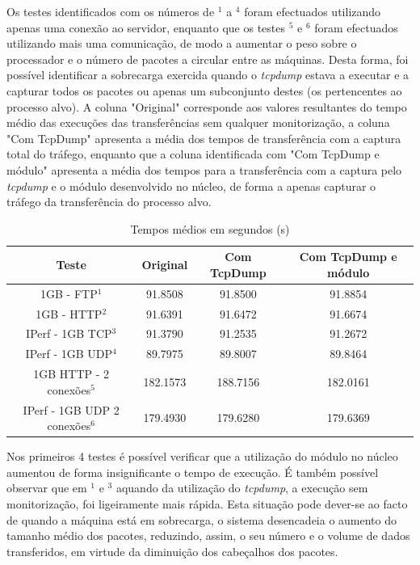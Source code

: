 \documentclass[a4paper]{llncs}
\begin{document}
Os testes identificados com os números de $^{1}$ a $^{4}$ foram efectuados utilizando apenas uma conexão ao servidor, enquanto que os testes $^{5}$ e $^{6}$ foram efectuados utilizando mais uma comunicação, de modo a aumentar o peso sobre o processador e o número de pacotes a circular entre as máquinas. 
 Desta forma, foi possível identificar a sobrecarga exercida quando o \textit{tcpdump} estava a executar e a capturar todos os pacotes ou apenas um subconjunto destes (os pertencentes ao processo alvo).
 A coluna "Original" corresponde aos valores resultantes do tempo médio das execuções das transferências sem qualquer monitorização, a coluna "Com TcpDump" apresenta a média dos tempos de transferência com a captura total do tráfego, enquanto que a coluna identificada com "Com TcpDump e módulo" apresenta a média dos tempos para a transferência com a captura pelo \textit{tcpdump} e o módulo desenvolvido no núcleo, de forma a apenas capturar o tráfego da transferência do processo alvo.
\vspace{-0.8cm}
\begin{table}
\begin{center}
\caption{Tempos médios em segundos (s)}
\begin{tabular}{ | c | c | c | c |  }
\hline
Teste & \hspace {0.3cm} Original \hspace {0.3cm}& \hspace {0.2cm} Com TcpDump \hspace {0.2cm} & Com TcpDump e módulo \\
\hline
1GB - FTP$^{1}$ & 91.8508	& 91.8500 & 91.8854 \\
1GB - HTTP$^{2}$ & 91.6391 & 91.6472 & 91.6674 \\ 
IPerf - 1GB TCP$^{3}$ & 91.3790	& 91.2535	& 91.2672 \\
IPerf - 1GB UDP$^{4}$ & 89.7975 & 89.8007 & 89.8464 \\
\hline
\hline
1GB HTTP - 2 conexões$^{5}$ & 182.1573 & 188.7156 & 182.0161 \\
IPerf - 1GB UDP 2 conexões$^{6}$ & 179.4930 & 179.6280 & 179.6369 \\
\hline
\end{tabular}
\label{tab:desempenho}
\end{center}
\end{table}
\vspace{-1.2cm}

Nos primeiros 4 testes é possível verificar que a utilização do módulo no núcleo aumentou de forma insignificante o tempo de execução.
 É também possível observar que em $^{1}$ e $^{3}$ aquando da utilização do \textit{tcpdump}, a execução sem monitorização, foi ligeiramente mais rápida.
 Esta situação pode dever-se ao facto de quando a máquina está em sobrecarga, o sistema desencadeia o aumento do tamanho médio dos pacotes, reduzindo, assim, o seu número e o volume de dados transferidos, em virtude da diminuição dos cabeçalhos dos pacotes.
\end{document}

